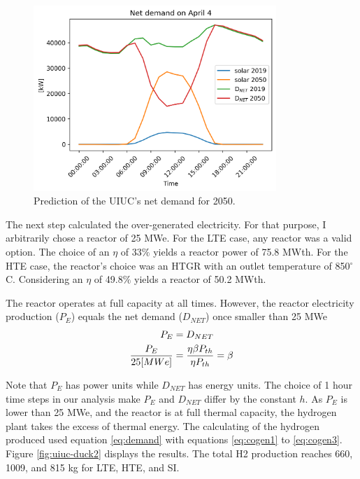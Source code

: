 \begin{figure}[htbp!]
	\centering
	\includegraphics[height=7cm]{figures-hydro/uiuc-duck}
	\hfill
	\caption{Prediction of the UIUC's net demand for 2050.}
	\label{fig:uiuc-duck1}
\end{figure}

The next step calculated the over-generated electricity.
For that purpose, I arbitrarily chose a reactor of 25 MWe.
For the LTE case, any reactor was a valid option.
The choice of an $\eta$ of 33$\%$ yields a reactor power of 75.8 MWth.
For the \gls{HTE} case, the reactor's choice was an HTGR with an outlet temperature of 850$^{\circ}$C.
Considering an $\eta$ of 49.8$\%$ yields a reactor of 50.2 MWth.

The reactor operates at full capacity at all times.
However, the reactor electricity production ($P_{E}$) equals the net demand ($D_{NET}$) once smaller than 25 MWe
\begin{align}
	P_{E} &= D_{NET}  \notag \\
  	\frac{P_E}{25 [MWe]} &= \frac{\eta \beta P_{th}}{\eta P_{th}} = \beta \label{eq:demand}
\end{align}

Note that $P_{E}$ has power units while $D_{NET}$ has energy units.
The choice of 1 hour time steps in our analysis make $P_{E}$ and $D_{NET}$ differ by the constant $h$.
As $P_{E}$ is lower than 25 MWe, and the reactor is at full thermal capacity, the hydrogen plant takes the excess of thermal energy.
The calculating of the hydrogen produced used equation \ref{eq:demand} with equations \ref{eq:cogen1} to \ref{eq:cogen3}.
Figure \ref{fig:uiuc-duck2} displays the results.
The total \gls{H2} production reaches 660, 1009, and 815 kg for \gls{LTE}, \gls{HTE}, and \gls{SI}.

